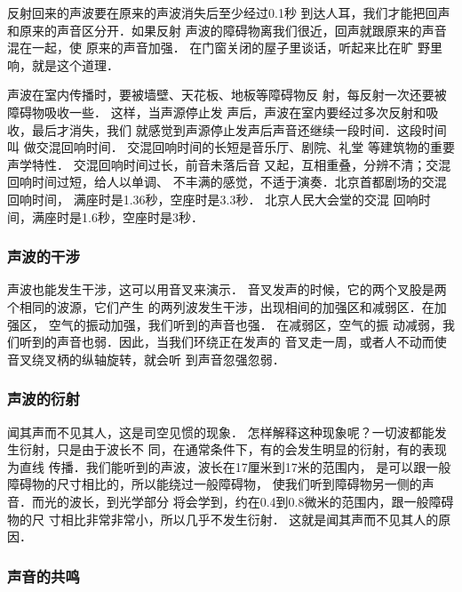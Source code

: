 反射回来的声波要在原来的声波消失后至少经过0.1秒
到达人耳，我们才能把回声和原来的声音区分开．如果反射
声波的障碍物离我们很近，回声就跟原来的声音混在一起，使
原来的声音加强．
在门窗关闭的屋子里谈话，听起来比在旷
野里响，就是这个道理．

声波在室内传播时，要被墙壁、天花板、地板等障碍物反
射，每反射一次还要被障碍物吸收一些．
这样，当声源停止发
声后，声波在室内要经过多次反射和吸收，最后才消失，我们
就感觉到声源停止发声后声音还继续一段时间．这段时间叫
做交混回响时间．
交混回响时间的长短是音乐厅、剧院、礼堂
等建筑物的重要声学特性．
交混回响时间过长，前音未落后音
又起，互相重叠，分辨不清；交混回响时间过短，给人以单调、
不丰满的感觉，不适于演奏．北京首都剧场的交混回响时间，
满座时是1.36秒，空座时是3.3秒．
北京人民大会堂的交混
回响时间，满座时是1.6秒，空座时是3秒．

\subsubsection{声波的干涉}

声波也能发生干涉，这可以用音叉来演示．
音叉发声的时候，它的两个叉股是两个相同的波源，它们产生
的两列波发生干涉，出现相间的加强区和减弱区．在加强区，
空气的振动加强，我们听到的声音也强．
在减弱区，空气的振
动减弱，我们听到的声音也弱．因此，当我们环绕正在发声的
音叉走一周，或者人不动而使音叉绕叉柄的纵轴旋转，就会听
到声音忽强忽弱．

\subsubsection{声波的衍射}

闻其声而不见其人，这是司空见惯的现象．
怎样解释这种现象呢？一切波都能发生衍射，只是由于波长不
同，在通常条件下，有的会发生明显的衍射，有的表现为直线
传播．我们能听到的声波，波长在17厘米到17米的范围内，
是可以跟一般障碍物的尺寸相比的，所以能绕过一般障碍物，
使我们听到障碍物另一侧的声音．而光的波长，到光学部分
将会学到，约在0.4到0.8微米的范围内，跟一般障碍物的尺
寸相比非常非常小，所以几乎不发生衍射．
这就是闻其声而不见其人的原因．


\subsubsection{声音的共鸣}


